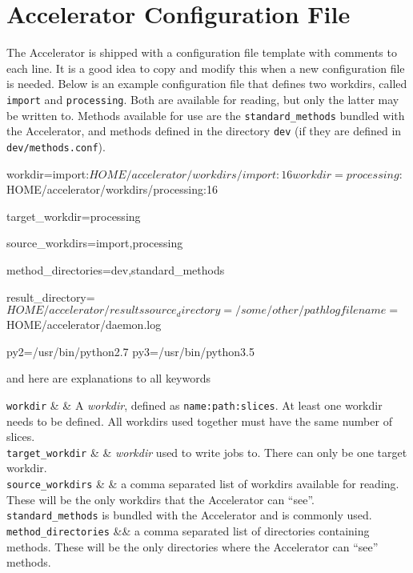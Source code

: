 
\section{Accelerator Configuration File}

The Accelerator is shipped with a configuration file template with
comments to each line.  It is a good idea to copy and modify this when
a new configuration file is needed.  Below is an example configuration
file that defines two workdirs, called \texttt{import} and
\texttt{processing}.  Both are available for reading, but only the
latter may be written to.  Methods available for use are the
\texttt{standard\_methods} bundled with the Accelerator, and methods
defined in the directory \texttt{dev} (if they are defined in
\texttt{dev/methods.conf}).
\begin{leftbar}
\begin{shell}
workdir=import:${HOME}/accelerator/workdirs/import:16
workdir=processing:${HOME}/accelerator/workdirs/processing:16

target_workdir=processing

source_workdirs=import,processing

method_directories=dev,standard_methods

result_directory=${HOME}/accelerator/results

source_directory=/some/other/path

logfilename=${HOME}/accelerator/daemon.log

py2=/usr/bin/python2.7
py3=/usr/bin/python3.5
\end{shell}
\end{leftbar}
\noindent and here are explanations to all keywords
\starttable

\RP \texttt{workdir} & & A \textsl{workdir}, defined as
\texttt{name:path:slices}.  At least one workdir needs to be defined.
All workdirs used together must have the same number of slices.\\

\RP \texttt{target\_workdir} & & \textsl{workdir} used to
write jobs to.  There can only be one target workdir.\\

\RP \texttt{source\_workdirs} & & a comma separated list of workdirs
available for reading.  These will be the only workdirs that the
Accelerator can ``see''.  \texttt{standard\_methods} is bundled with
the Accelerator and is commonly used.\\

\RP \texttt{method\_directories} && a comma separated list of
directories containing methods.  These will be the only directories
where the Accelerator can ``see'' methods.\\

